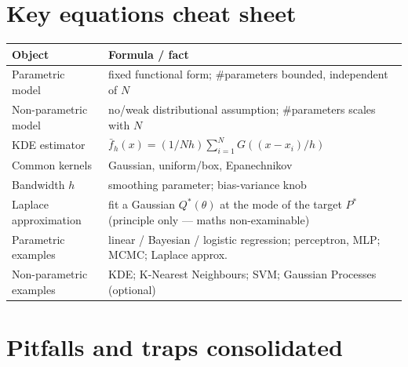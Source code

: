 \documentclass[11pt, a4paper]{article}
\newcommand{\thead}[1]{\textbf{#1}}
\begin{document}
\section*{Key equations cheat sheet}

\begin{tabularx}{\linewidth}{@{}lX@{}}
\toprule
\thead{Object} & \thead{Formula / fact} \\
\midrule
Parametric model       & fixed functional form; \#parameters bounded, independent of $N$ \\
Non-parametric model   & no/weak distributional assumption; \#parameters scales with $N$ \\
KDE estimator          & $\bar f_h(x) = (1/Nh)\sum_{i=1}^N G((x-x_i)/h)$ \\
Common kernels         & Gaussian, uniform/box, Epanechnikov \\
Bandwidth $h$          & smoothing parameter; bias-variance knob \\
Laplace approximation  & fit a Gaussian $Q^*(\theta)$ at the mode of the target $P^*$ (principle only — maths non-examinable) \\
Parametric examples    & linear / Bayesian / logistic regression; perceptron, MLP; MCMC; Laplace approx. \\
Non-parametric examples & KDE; K-Nearest Neighbours; SVM; Gaussian Processes (optional) \\
\bottomrule
\end{tabularx}

\section*{Pitfalls and traps consolidated}
\end{document}
